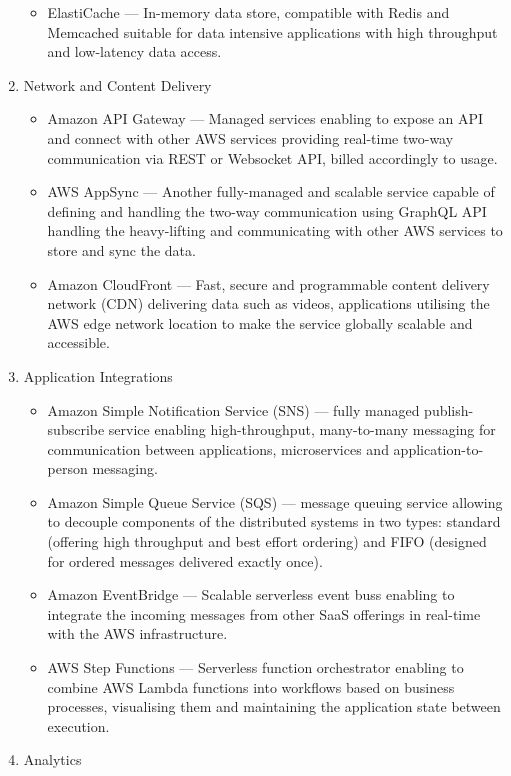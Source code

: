 \begin{enumerate}
\begin{itemize}
       \item ElastiCache --- In-memory data store, compatible with Redis and Memcached suitable for data intensive applications with high throughput and low-latency data access.
   \end{itemize}
   \item Network and Content Delivery
   \begin{itemize}
       \item Amazon API Gateway --- Managed services enabling to expose an API and connect with other AWS services providing real-time two-way communication via REST or Websocket API, billed accordingly to usage.
       \item AWS AppSync --- Another fully-managed and scalable service capable of defining and handling the two-way communication using GraphQL API handling the heavy-lifting and communicating with other AWS services to store and sync the data.
       \item Amazon CloudFront --- Fast, secure and programmable content delivery network (CDN) delivering data such as videos, applications utilising the AWS edge network location to make the service globally scalable and accessible.
   \end{itemize}
   \item Application Integrations
   \begin{itemize}
       \item Amazon Simple Notification Service (SNS) --- fully managed publish-subscribe service enabling high-throughput, many-to-many messaging for communication between applications, microservices and application-to-person messaging.
       \item Amazon Simple Queue Service (SQS) --- message queuing service allowing to decouple components of the distributed systems in two types: standard (offering high throughput and best effort ordering) and FIFO (designed for ordered messages delivered exactly once).
       \item Amazon EventBridge --- Scalable serverless event buss enabling to integrate the incoming messages from other SaaS offerings in real-time with the AWS infrastructure.
       \item AWS Step Functions --- Serverless function orchestrator enabling to combine AWS Lambda functions into workflows based on business processes, visualising them and maintaining the application state between execution.
   \end{itemize}
   \item Analytics

\end{enumerate}
